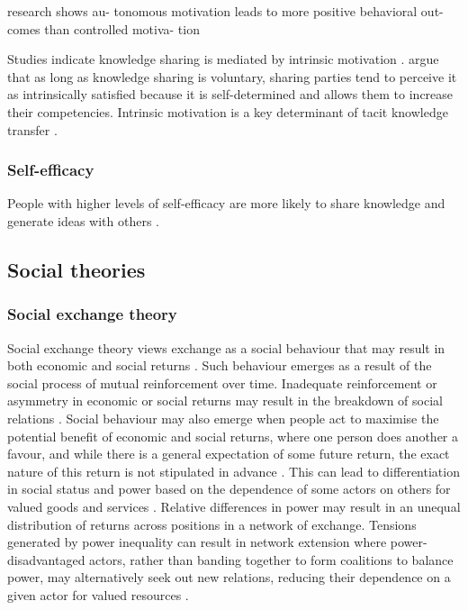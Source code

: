 research shows au- tonomous motivation leads to more positive behavioral out- comes than controlled motiva- tion

\medskip

Studies indicate knowledge sharing is mediated by intrinsic motivation \citep{bock2001breaking}. \citet{kaser2001knowledge} argue that as long as knowledge sharing is voluntary, sharing parties tend to perceive it as intrinsically satisfied because it is self-determined and allows them to increase their competencies. Intrinsic motivation is a key determinant of tacit knowledge transfer \citep{kaser2001knowledge,lam2010knowledge,dumbach2014establishing}. 

\subsubsection{Self-efficacy}

People with higher levels of self-efficacy are more likely to share knowledge and generate ideas with others \citep{tierney2002creative,lin2007effects}. 


\subsection{Social theories}

\subsubsection{Social exchange theory}

Social exchange theory views exchange as a social behaviour that may result in both economic and social returns \citep{lambe2001social}. Such behaviour emerges as a result of the social process of mutual reinforcement over time. Inadequate reinforcement or asymmetry in economic or social returns may result in the breakdown of social relations \citep{homans1961social}. Social behaviour may also emerge when people act to maximise the potential benefit of economic and social returns, where one person does another a favour, and while there is a general expectation of some future return, the exact nature of this return is not stipulated in advance \citep{blau1986exchange}. This can lead to differentiation in social status and power based on the dependence of some actors on others for valued goods and services \citep{emerson1962power}. Relative differences in power may result in an unequal distribution of returns across positions in a network of exchange. Tensions generated by power inequality can result in network extension where power-disadvantaged actors, rather than banding together to form coalitions to balance power, may alternatively seek out new relations, reducing their dependence on a given actor for valued resources \citep{cook2013social}. 

